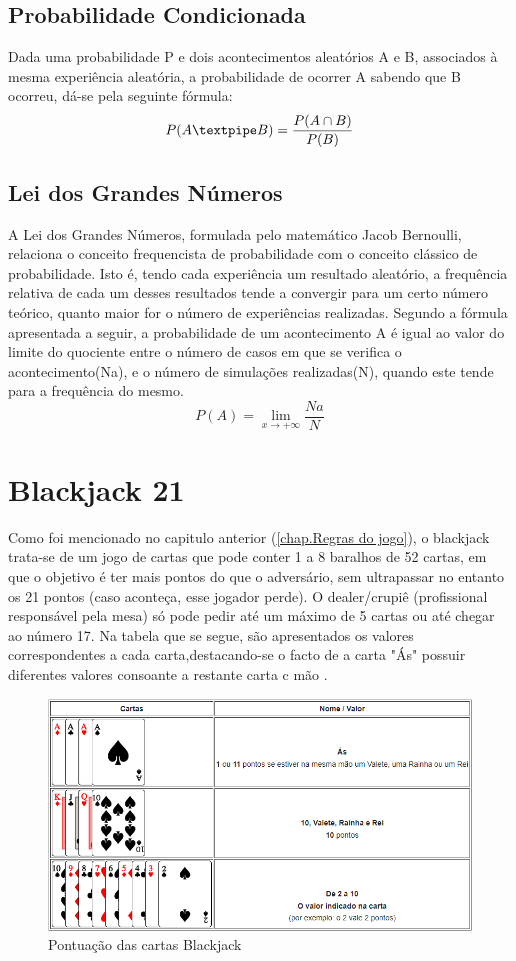 \documentclass{report}
\begin{document}
\subsection{Probabilidade Condicionada}
Dada uma probabilidade P e dois acontecimentos aleatórios A e B, associados à mesma experiência aleatória, a probabilidade de ocorrer A sabendo que B ocorreu, dá-se pela seguinte fórmula:
\begin{equation} \label{eq2}
P(A\textpipe B)=\frac{P(A\cap B)}{P(B)}
\end{equation}
\subsection{Lei dos Grandes Números}
A Lei dos Grandes Números, formulada pelo matemático Jacob Bernoulli, relaciona o conceito frequencista de probabilidade com o conceito clássico de probabilidade. Isto é, tendo cada experiência um resultado aleatório, a frequência relativa de cada um desses resultados tende a convergir para um certo número teórico, quanto maior for o número de experiências realizadas. Segundo a fórmula apresentada a seguir, a probabilidade de um acontecimento A é igual ao valor do limite do quociente entre o número de casos em que se verifica o acontecimento(Na), e o número de simulações realizadas(N), quando este tende para a frequência do mesmo. \cite{Info}  
\begin{equation} \label{eq3}
P(A)= \lim_{x \rightarrow +\infty} \frac{Na}{N}
\end{equation}
\newpage
\section{Blackjack 21}
Como foi mencionado no capitulo anterior (\autoref{chap.Regras do jogo}), o blackjack trata-se de um jogo de cartas que pode conter 1 a 8 baralhos de 52 cartas, em que o objetivo é ter mais pontos do que o adversário, sem ultrapassar no entanto os 21 pontos (caso aconteça, esse jogador perde). O dealer/crupiê (profissional responsável pela mesa) só pode pedir até um máximo de 5 cartas ou até chegar ao número 17. Na tabela que se segue, são apresentados os valores correspondentes a cada carta,destacando-se o facto de a carta "Ás" possuir diferentes valores consoante a restante carta c mão \cite{cardoso2018estudo}.
\begin{figure}[H]
\center
\includegraphics[scale=0.36]{fotos/3.png}
\caption{Pontuação das cartas Blackjack \cite{wiki}}
\end{figure}
\end{document}
